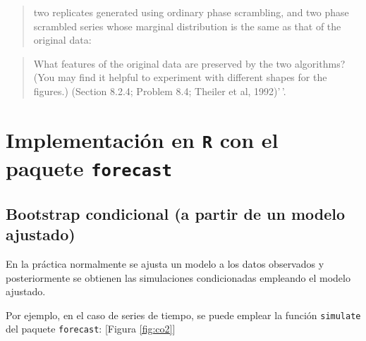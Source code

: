 \documentclass[
]{book}
\newenvironment{Shaded}{\begin{snugshade}}{\end{snugshade}}
\newcommand{\CommentTok}[1]{\textcolor[rgb]{0.56,0.35,0.01}{\textit{#1}}}
\newcommand{\FloatTok}[1]{\textcolor[rgb]{0.00,0.00,0.81}{#1}}
\newcommand{\FunctionTok}[1]{\textcolor[rgb]{0.00,0.00,0.00}{#1}}
\newcommand{\NormalTok}[1]{#1}
\newcommand{\OtherTok}[1]{\textcolor[rgb]{0.56,0.35,0.01}{#1}}
\newcommand{\SpecialCharTok}[1]{\textcolor[rgb]{0.00,0.00,0.00}{#1}}
\theoremstyle{break}
\theoremstyle{definition}
\theoremstyle{definition}
\theoremstyle{definition}
\theoremstyle{definition}
\theoremstyle{remark}
\begin{document}
\begin{quote}
two replicates generated using ordinary phase scrambling,
and two phase scrambled series whose marginal distribution is the same as that of the original data:
\end{quote}

\begin{Shaded}
\end{Shaded}

\begin{quote}
What features of the original data are preserved
by the two algorithms?
(You may find it helpful to experiment with
different shapes for the figures.)
(Section 8.2.4; Problem 8.4; Theiler et al, 1992)'\,'.
\end{quote}

\hypertarget{implementaciuxf3n-en-r-con-el-paquete-forecast}{%
\section{\texorpdfstring{Implementación en \texttt{R} con el paquete \texttt{forecast}}{Implementación en R con el paquete forecast}}\label{implementaciuxf3n-en-r-con-el-paquete-forecast}}

\hypertarget{bootstrap-condicional-a-partir-de-un-modelo-ajustado}{%
\subsection{Bootstrap condicional (a partir de un modelo ajustado)}\label{bootstrap-condicional-a-partir-de-un-modelo-ajustado}}

En la práctica normalmente se ajusta un modelo a los datos observados y
posteriormente se obtienen las simulaciones condicionadas empleando
el modelo ajustado.

Por ejemplo, en el caso de series de tiempo, se puede emplear la función \texttt{simulate}
del paquete \texttt{forecast}: {[}Figura \ref{fig:co2}{]}
\end{document}
